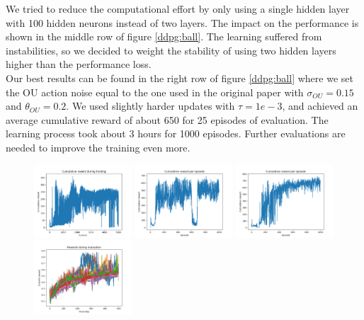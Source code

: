 We tried to reduce the computational effort by only using a single hidden layer with 100 hidden neurons instead of two layers. The impact on the performance is shown in the middle row of figure \ref{ddpg:ball}. The learning suffered from instabilities, so we decided to weight the stability of using two hidden layers higher than the performance loss.\\
Our best results can be found in the right row of figure \ref{ddpg:ball} where we set the OU action noise equal to the one used in the original paper with $\sigma_{OU}=0.15$ and $\theta_{OU}=0.2$. We used slightly harder updates with $\tau=1e-3$, and achieved an average cumulative reward of about 650 for 25 episodes of evaluation. The learning process took about 3 hours for 1000 episodes. Further evaluations are needed to improve the training even more.
\begin{figure}[H]
	\includegraphics[width=0.325\textwidth]{plots/ddpg_ball_first_train.png}
	\includegraphics[width=0.325\textwidth]{plots/ddpg_ball_1layer_train.png}
	\includegraphics[width=0.325\textwidth]{plots/ddpg_ball_best_train.png}
	\includegraphics[width=0.325\textwidth]{plots/ddpg_ball_first_eval.png}

\end{figure}
